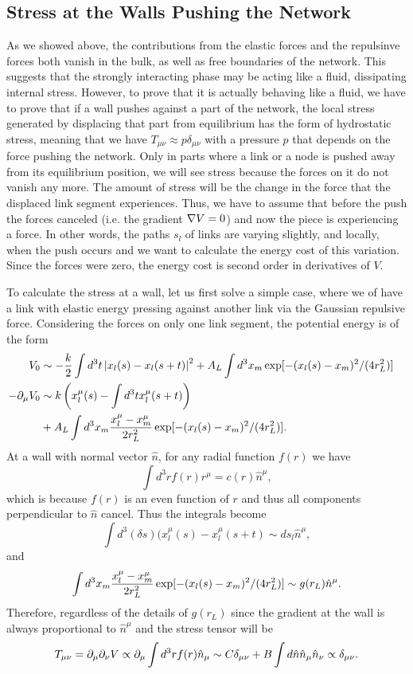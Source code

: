 \documentclass[linenumbers,endfloats,nofootinbib,preprint,floatfix,titlepage,superscriptaddress]{revtex4-1} %
\begin{document}
\subsection{Stress at the Walls Pushing the Network}
As we showed above, the contributions from the elastic forces and the repulsinve forces both vanish in the bulk, as well as free boundaries of the network. This suggests that the strongly interacting phase may be acting like a fluid, dissipating internal stress. 
However, to prove that it is actually behaving like a fluid, we have to prove that if a wall pushes against a part of the network, the local stress generated by displacing that part from equilibrium has the form of hydrostatic stress, meaning that we have $T_{\mu\nu} \approx p \delta_{\mu\nu}$ with a pressure $p$ that depends on the force pushing the network. 
Only in parts where a link or a node is pushed away from its equilibrium position, we will see stress because the forces on it do not vanish any more.
The amount of stress will be the change in the force that the displaced link segment experiences.
Thus, we have to assume that before the push the forces canceled (i.e. the gradient $\nabla V = 0$) and now the piece is experiencing a force. 
In other words, the paths $s_l$ of links are varying slightly, and locally, when the push occurs and we want to calculate the energy cost of this variation.
Since the forces were zero, the energy cost is second order in derivatives of $V$. 

To calculate the stress at a wall, let us first solve a simple case, where we of have a link with elastic energy pressing against another link via the Gaussian repulsive force. 
Considering the forces on only one link segment, the potential energy is of the form
\begin{align}
    V_0 &\sim -{k\over 2} \int d^3t \left|x_l(s)- x_l(s+t)\right|^2 + A_L \int d^3 x_m \exp[-(x_l(s) - x_m)^2/ (4r_L^2)]   \cr 
    -\partial_\mu V_0 & \sim k \left(x_l^\mu(s)- \int d^3t x^\mu_l(s+t)\right) \cr & + A_L \int d^3 x_m {x_l^\mu-x_m^\mu  \over 2r_L^2} \exp[-(x_l(s) - x_m)^2/ (4r_L^2)].
\end{align}
At a wall with normal vector $\hat{n}$, for any radial function $f(r)$ we have 
\[\int d^3 r f(r) r^\mu = c(r) \hat{n}^\mu, \]
which is because $f(r) $ is an even function of $r$ and thus all components perpendicular to $\hat{n}$ cancel. 
Thus the integrals become 
\[\int d^3(\delta s) (x_l^\mu (s) - x^\mu_l(s+t) \sim ds_l\hat{n}^\mu,\]
and  
\[\int d^3 x_m {x_l^\mu-x_m^\mu  \over 2r_L^2} \exp[-(x_l(s) - x_m)^2/ (4r_L^2)] \sim g(r_L) \hat{n}^\mu . \]
Therefore, regardless of the details of $g(r_L)$ since the gradient at the wall is always proportional to $\hat{n}^\mu $ and the stress tensor will be 
\[T_{\mu\nu} = \partial_\mu\partial_\nu V \propto \partial_\mu \int d^3r f(r)\hat{n}_\mu \sim C \delta_{\mu\nu} + B\int d\hat{n} \hat{n}_\mu \hat{n}_\nu \propto \delta_{\mu\nu}. \]
\end{document}
